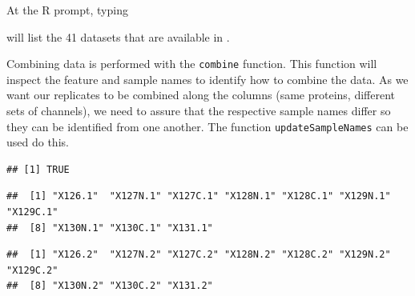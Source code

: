 At the R prompt, typing

\begin{knitrout}
\color{fgcolor}\begin{kframe}
\begin{alltt}
\hlstd{()}
\end{alltt}
\end{kframe}
\end{knitrout}

will list the 41 datasets that are
available in .


Combining data is performed with the \texttt{combine} function. This
function will inspect the feature and sample names to identify how to
combine the data. As we want our replicates to be combined along the
columns (same proteins, different sets of channels), we need to assure
that the respective sample names differ so they can be identified from
one another. The function \texttt{updateSampleNames} can be used do
this.

\begin{knitrout}
\color{fgcolor}\begin{kframe}
\begin{alltt}
\hlstd{(} 
\end{alltt}
\begin{verbatim}
## [1] TRUE
\end{verbatim}
\begin{alltt}
 \hlkwb{<-}  \hlstd{)}
 \hlkwb{<-}  \hlstd{)}
\end{alltt}
\begin{verbatim}
##  [1] "X126.1"  "X127N.1" "X127C.1" "X128N.1" "X128C.1" "X129N.1" "X129C.1"
##  [8] "X130N.1" "X130C.1" "X131.1"
\end{verbatim}
\begin{alltt}
\end{alltt}
\begin{verbatim}
##  [1] "X126.2"  "X127N.2" "X127C.2" "X128N.2" "X128C.2" "X129N.2" "X129C.2"
##  [8] "X130N.2" "X130C.2" "X131.2"
\end{verbatim}
\end{kframe}
\end{knitrout}

